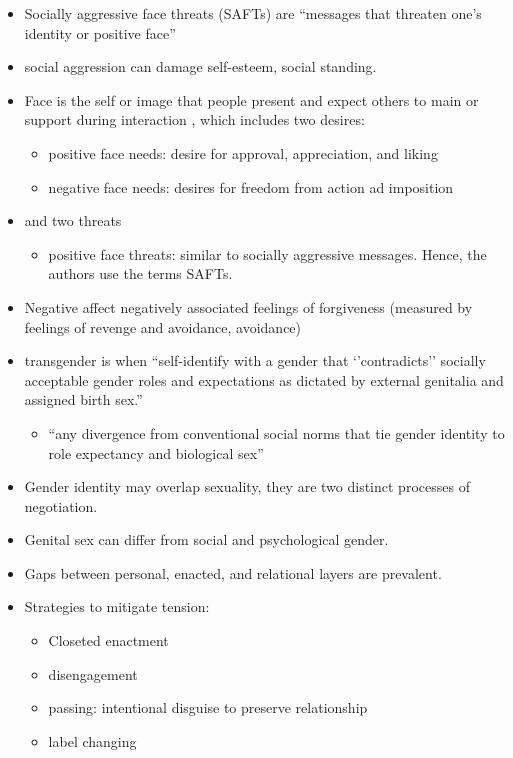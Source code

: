 \documentclass[
]{book}
\providecommand{\tightlist}{%
  \setlength{\itemsep}{0pt}\setlength{\parskip}{0pt}}
\begin{document}
\begin{itemize}
\item
  Socially aggressive face threats (SAFTs) are ``messages that threaten one's identity or positive face''
\item
  social aggression can damage self-esteem, social standing.
\item
  Face is the self or image that people present and expect others to main or support during interaction
  \citep{Cupach_1994}, which includes two desires:

  \begin{itemize}
  \item
    positive face needs: desire for approval, appreciation, and liking
  \item
    negative face needs: desires for freedom from action ad imposition
  \end{itemize}
\item
  and two threats

  \begin{itemize}
  \tightlist
  \item
    positive face threats: similar to socially aggressive messages. Hence, the authors use the terms SAFTs.
  \end{itemize}
\item
  Negative affect negatively associated feelings of forgiveness (measured by feelings of revenge and avoidance,
  avoidance)
\end{itemize}

\citep{Nuru_2014}

\begin{itemize}
\item
  transgender is when ``self-identify with a gender that `'contradicts'' socially acceptable gender roles and
  expectations as dictated by external genitalia and assigned birth sex.''

  \begin{itemize}
  \tightlist
  \item
    ``any divergence from conventional social norms that tie gender identity to role expectancy and biological sex''
    \citep{Bornstein_2013}
  \end{itemize}
\item
  Gender identity may overlap sexuality, they are two distinct processes of negotiation.
\item
  Genital sex can differ from social and psychological gender.
\item
  Gaps between personal, enacted, and relational layers are prevalent.
\item
  Strategies to mitigate tension:

  \begin{itemize}
  \item
    Closeted enactment
  \item
    disengagement
  \item
    passing: intentional disguise to preserve relationship
  \item
    label changing
  \end{itemize}
\end{itemize}
\end{document}
